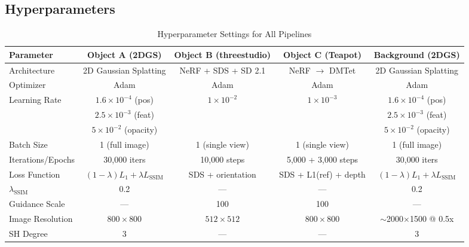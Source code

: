 \documentclass{article}
\begin{document}
\subsection{Hyperparameters}

\begin{table}[H]
\centering
\caption{Hyperparameter Settings for All Pipelines}
\label{tab:hyperparams}
\small
\begin{tabular}{@{}lcccc@{}}
\toprule
\textbf{Parameter} & \textbf{Object A (2DGS)} & \textbf{Object B (threestudio)} & \textbf{Object C (Teapot)} & \textbf{Background (2DGS)} \\
\midrule
Architecture        & 2D Gaussian Splatting & NeRF + SDS + SD 2.1    & NeRF $\rightarrow$ DMTet   & 2D Gaussian Splatting \\
Optimizer           & Adam                  & Adam                    & Adam                        & Adam \\
Learning Rate       & $1.6\times10^{-4}$ (pos) & $1\times10^{-2}$     & $1\times10^{-3}$            & $1.6\times10^{-4}$ (pos) \\
                    & $2.5\times10^{-3}$ (feat) &                       &                             & $2.5\times10^{-3}$ (feat) \\
                    & $5\times10^{-2}$ (opacity) &                       &                             & $5\times10^{-2}$ (opacity) \\
Batch Size          & 1 (full image)        & 1 (single view)        & 1 (single view)             & 1 (full image) \\
Iterations/Epochs   & 30,000 iters          & 10,000 steps           & 5,000 + 3,000 steps         & 30,000 iters \\
Loss Function       & $(1-\lambda)L_1 + \lambda L_{\text{SSIM}}$ & SDS + orientation & SDS + L1(ref) + depth       & $(1-\lambda)L_1 + \lambda L_{\text{SSIM}}$ \\
$\lambda_{\text{SSIM}}$ & 0.2                & ---                    & ---                         & 0.2 \\
Guidance Scale      & ---                   & 100                    & 100                         & --- \\
Image Resolution    & $800\times800$        & $512\times512$         & $800\times800$              & $\sim$2000$\times$1500 @ 0.5x \\
SH Degree           & 3                     & ---                    & ---                         & 3 \\

\end{tabular}
\end{table}
\end{document}
